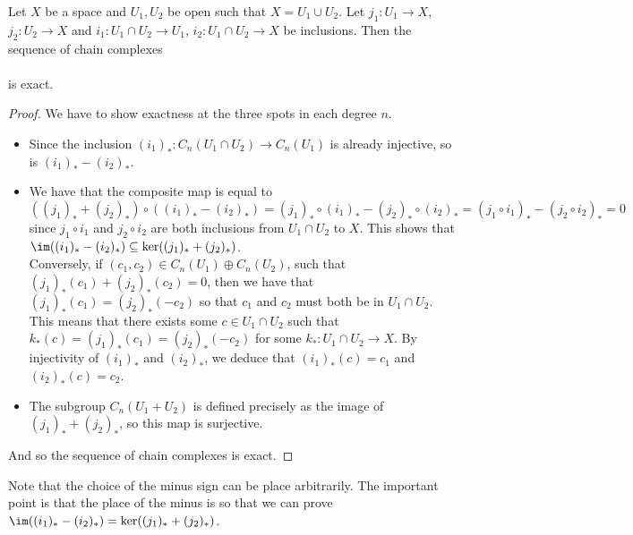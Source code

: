 \documentclass[a4paper]{article}
\begin{document}
\begin{prp}{}{} Let $X$ be a space and $U_1,U_2$ be open such that $X=U_1\cup U_2$. Let $j_1:U_1\to X$, $j_2:U_2\to X$ and $i_1:U_1\cap U_2\to U_1$, $i_2:U_1\cap U_2\to X$ be inclusions. Then the sequence of chain complexes \\
\\
is exact. 
\begin{proof}
We have to show exactness at the three spots in each degree $n$. 
\begin{itemize}
\item Since the inclusion $(i_1)_\ast:C_n(U_1\cap U_2)\to C_n(U_1)$ is already injective, so is $(i_1)_\ast-(i_2)_\ast$. 
\item We have that the composite map is equal to $$((j_1)_\ast+(j_2)_\ast)\circ((i_1)_\ast-(i_2)_\ast)=(j_1)_\ast\circ(i_1)_\ast-(j_2)_\ast\circ(i_2)_\ast=(j_1\circ i_1)_\ast-(j_2\circ i_2)_\ast=0$$ since $j_1\circ i_1$ and $j_2\circ i_2$ are both inclusions from $U_1\cap U_2$ to $X$. This shows that $\im((i_1)_\ast-(i_2)_\ast)\subseteq\ker((j_1)_\ast+(j_2)_\ast)$. \\

Conversely, if $(c_1,c_2)\in C_n(U_1)\oplus C_n(U_2)$, such that $(j_1)_\ast(c_1)+(j_2)_\ast(c_2)=0$, then we have that $(j_1)_\ast(c_1)=(j_2)_\ast(-c_2)$ so that $c_1$ and $c_2$ must both be in $U_1\cap U_2$. This means that there exists some $c\in U_1\cap U_2$ such that $k_\ast(c)=(j_1)_\ast(c_1)=(j_2)_\ast(-c_2)$ for some $k_\ast:U_1\cap U_2\to X$. By injectivity of $(i_1)_\ast$ and $(i_2)_\ast$, we deduce that $(i_1)_\ast(c)=c_1$ and $(i_2)_\ast(c)=c_2$. 
\item The subgroup $C_n(U_1+U_2)$ is defined precisely as the image of $(j_1)_\ast+(j_2)_\ast$, so this map is surjective. 
\end{itemize}
And so the sequence of chain complexes is exact. 
\end{proof}
\end{prp}

Note that the choice of the minus sign can be place arbitrarily. The important point is that the place of the minus is so that we can prove $\im((i_1)_\ast-(i_2)_\ast)=\ker((j_1)_\ast+(j_2)_\ast)$. 
\end{document}
